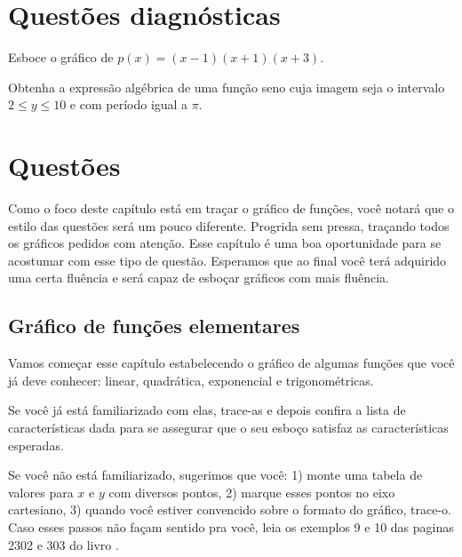 \documentclass[main_estudante.tex]{subfiles}
\begin{document}
\newpage

\section{Questões diagnósticas}

\begin{diagnostico}
Esboce o gráfico de $p(x)=(x-1)(x+1)(x+3)$.
\end{diagnostico}

\vspace{4cm}

\begin{diagnostico}
Obtenha a expressão algébrica de uma função seno cuja imagem seja o intervalo $2\leq y \leq 10$ e com período igual a $\pi$.
\end{diagnostico}

\newpage

\section{Questões}

Como o foco deste capítulo está em traçar o gráfico de funções, você notará que o estilo das questões será um pouco diferente. Progrida sem pressa, traçando todos os gráficos pedidos com atenção. Esse capítulo é uma boa oportunidade para se acostumar com esse tipo de questão. Esperamos que ao final você terá adquirido uma certa fluência e será capaz de esboçar gráficos com mais fluência.

\subsection*{Gráfico de funções elementares}

Vamos começar esse capítulo estabelecendo o gráfico de algumas funções que você já deve conhecer: linear, quadrática, exponencial e trigonométricas.

Se você já está familiarizado com elas, trace-as e depois confira a lista de características dada para se assegurar que o seu esboço satisfaz as características esperadas.

Se você não está familiarizado, sugerimos que você: 1) monte uma tabela de valores para $x$ e $y$ com diversos pontos, 2) marque esses pontos no eixo cartesiano, 3) quando você estiver convencido sobre o formato do gráfico, trace-o. Caso esses passos não façam sentido pra você, leia os exemplos 9 e 10 das paginas 2302 e 303 do livro .
\end{document}
